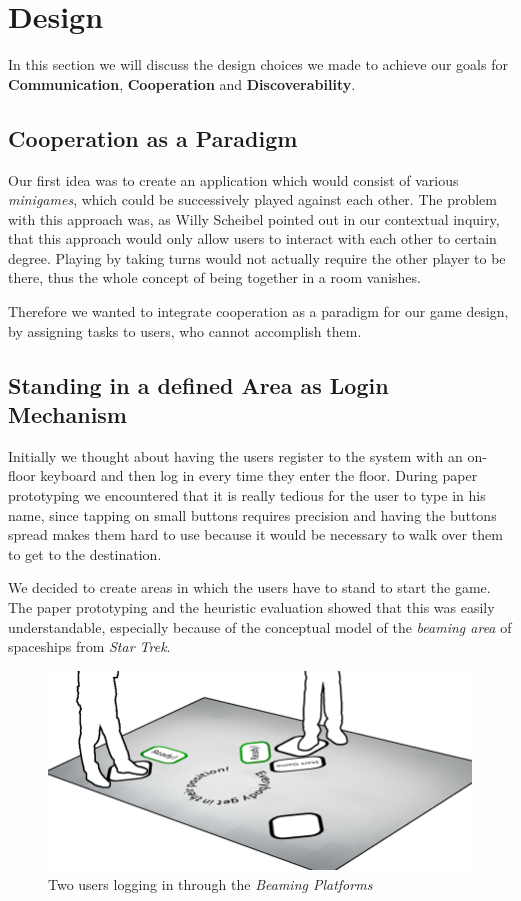 \documentclass{sigchi}
\begin{document}
\section{Design}
\vspace{1mm}
In this section we will discuss the design choices we made to achieve our goals for \textbf{Communication}, \textbf{Cooperation} and \textbf{Discoverability}.

\subsection{Cooperation as a Paradigm}
\vspace{1mm}
Our first idea was to create an application which would consist of various \textit{minigames}, which could be successively played against each other. The problem with this approach was, as Willy Scheibel pointed out in our contextual inquiry, that this approach would only allow users to interact with each other to certain degree. Playing by taking turns would not actually require the other player to be there, thus the whole concept of being together in a room vanishes. 

Therefore we wanted to integrate cooperation as a paradigm for our game design, by assigning tasks to users, who cannot accomplish them.
 
\subsection{Standing in a defined Area as Login Mechanism}
\vspace{1mm}
Initially we thought about having the users register to the system with an on-floor keyboard and then log in every time they enter the floor. During paper prototyping we encountered that it is really tedious for the user to type in his name, since tapping on small buttons requires precision and having the buttons spread makes them hard to use because it would be necessary to walk over them to get to the destination. 

We decided to create areas in which the users have to stand to start the game. The paper prototyping and the heuristic evaluation showed that this was easily understandable, especially because of the conceptual model of the \textit{beaming area} of spaceships from \textit{Star Trek}. 

\begin{figure}[H]
\centering
\includegraphics[width=0.99\columnwidth]{walkthrough/totale1}
\caption{Two users logging in through the \textit{Beaming Platforms}}
\label{fig:beamingArea}
\end{figure}
\end{document}
